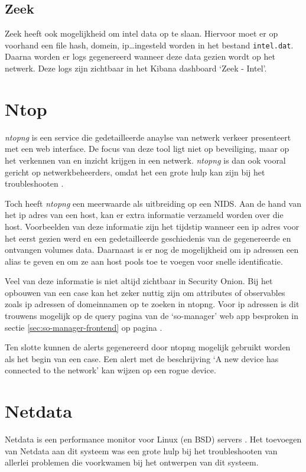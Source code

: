 \documentclass[a4paper, 12pt]{report}
\begin{document}
\subsection{Zeek}
Zeek heeft ook mogelijkheid om intel data op te slaan.
Hiervoor moet er op voorhand een file hash, domein, ip\dots ingesteld worden in het bestand \lstinline|intel.dat|.
Daarna worden er logs gegenereerd wanneer deze data gezien wordt op het netwerk.
Deze logs zijn zichtbaar in het Kibana dashboard `Zeek - Intel'.

\section{Ntop}
\emph{ntopng} is een service die gedetailleerde anaylse van netwerk verkeer presenteert met een web interface.
De focus van deze tool ligt niet op beveiliging, maar op het verkennen van en inzicht krijgen in een netwerk.
\emph{ntopng} is dan ook vooral gericht op netwerkbeheerders, omdat het een grote hulp kan zijn bij het troubleshooten \autocite{ntop:ntopng}.

Toch heeft \emph{ntopng} een meerwaarde als uitbreiding op een NIDS.
Aan de hand van het ip adres van een host, kan er extra informatie verzameld worden over die host.
Voorbeelden van deze informatie zijn het tijdstip wanneer een ip adres voor het eerst gezien werd en een gedetailleerde geschiedenis van de gegenereerde en ontvangen volumes data.
Daarnaast is er nog de mogelijkheid om ip adressen een alias te geven en om ze aan host pools toe te voegen voor snelle identificatie.

Veel van deze informatie is niet altijd zichtbaar in Security Onion.
Bij het opbouwen van een case kan het zeker nuttig zijn om attributes of observables zoals ip adressen of domeinnamen op te zoeken in ntopng.
Voor ip adressen is dit trouwens mogelijk op de query pagina van de `so-manager' web app besproken in sectie \ref{sec:so-manager-frontend} op pagina \pageref{sec:so-manager-frontend}.

Ten slotte kunnen de alerts gegenereerd door ntopng mogelijk gebruikt worden als het begin van een case.
Een alert met de beschrijving `A new device has connected to the network' kan wijzen op een rogue device.

\section{Netdata}
Netdata is een performance monitor voor Linux (en BSD) servers \autocite{netdata:home}.
Het toevoegen van Netdata aan dit systeem was een grote hulp bij het troubleshooten van allerlei problemen die voorkwamen bij het ontwerpen van dit systeem.
\end{document}
